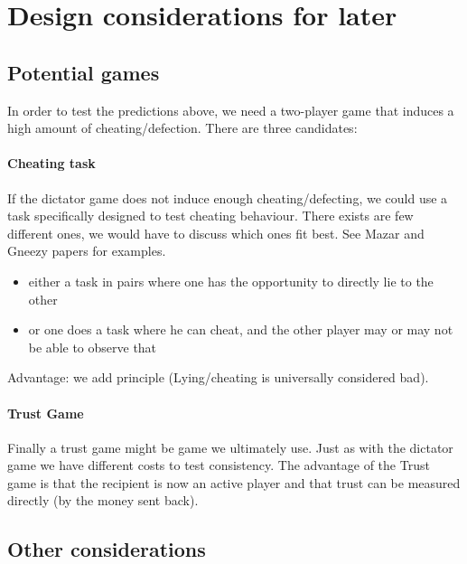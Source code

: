 \documentclass[11pt]{article}
\theoremstyle{plainCl1}
\begin{document}
\section{Design considerations for later}

\subsection{Potential games}
In order to test the predictions above, we need a two-player game that induces a high amount of cheating/defection. There are three candidates:

\paragraph{Cheating task}

If the dictator game does not induce enough cheating/defecting, we could use a task specifically designed to test cheating behaviour. 
There exists are few different ones, we would have to discuss which ones fit best. See Mazar and Gneezy papers for examples.
\begin{itemize}
    \item either a task in pairs where one has the opportunity to directly lie to the other
    \item or one does a task where he can cheat, and the other player may or may not be able to observe that
\end{itemize}
Advantage: we add principle (Lying/cheating is universally considered bad). 

\paragraph{Trust Game}

Finally a trust game might be game we ultimately use. Just as with the dictator game we have different costs to test consistency. 
The advantage of the Trust game is that the recipient is now an active player and that trust can be measured directly (by the money sent back). 

\subsection{Other considerations}
\end{document}
